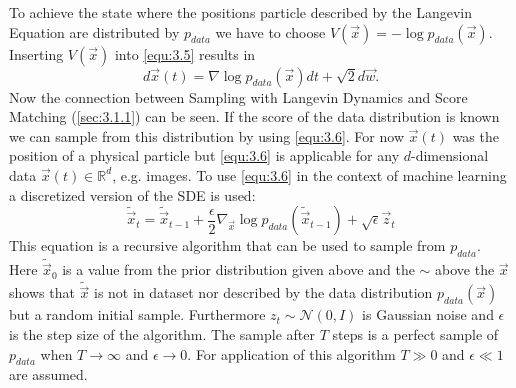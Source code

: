 To achieve the state where the positions particle described by the Langevin Equation are distributed by $p_{data}$ we have to choose $V(\vec{x})=-\log p_{data}({\vec{x}})$. Inserting $V(\vec{x})$ into \cref{equ:3.5} results in
%
\begin{equation} \label{equ:3.6}
    d\vec{x}(t)=\nabla\log p_{data}(\vec{x})dt+\sqrt{2}d\vec{w}.
\end{equation}
%
Now the connection between Sampling with Langevin Dynamics and Score Matching (\cref{sec:3.1.1}) can be seen. If the score of the data distribution is known we can sample from this distribution by using \cref{equ:3.6}. For now $\vec{x}(t)$ was the position of a physical particle but \cref{equ:3.6} is applicable for any $d$-dimensional data $\vec{x}(t)\in\mathbb{R}^d$, e.g. images. To use \cref{equ:3.6} in the context of machine learning a discretized version of the SDE is used:
%
\begin{equation} \label{equ:3.7}
    \tilde{\vec{x}}_t=\tilde{\vec{x}}_{t-1}+\frac{\epsilon}{2}\nabla_{\vec{x}}\log p_{data}(\tilde{\vec{x}}_{t-1})+\sqrt{\epsilon}\vec{z}_t
\end{equation}
%
This equation is a recursive algorithm that can be used to sample from $p_{data}$. Here $\tilde{\vec{x}}_0$ is a value from the prior distribution given above and the $\sim$ above the $\vec{x}$ shows that $\tilde{\vec{x}}$ is not in dataset nor described by the data distribution $p_{data}(\vec{x})$ but a random initial sample. Furthermore $z_t\sim\mathcal{N}(0, I)$ is Gaussian noise and $\epsilon$ is the step size of the algorithm. The sample after $T$ steps is a perfect sample of $p_{data}$ when $T\rightarrow\infty$ and $\epsilon\rightarrow0$. For application of this algorithm $T\gg0$ and $\epsilon\ll1$ are assumed.

